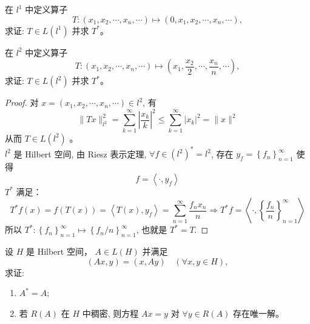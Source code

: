 \documentclass[lang=cn,newtx,10pt,scheme=chinese,thmcnt=chapter]{elegantbook}
\begin{document}
\begin{problem}
  在 ${l}^1$ 中定义算子
  \[
  T : (x_1, x_2, \cdots, x_n, \cdots) \mapsto (0, x_1, x_2, \cdots, x_n, \cdots),
  \]
  求证: $T \in {L}({l}^1)$ 并求 $T^*$。
\end{problem}

\begin{problem}
  在 ${l}^2$ 中定义算子
  \[
  T : (x_1, x_2, \cdots, x_n, \cdots) \mapsto (x_1, \frac{x_2}{2}, \cdots, \frac{x_n}{n}, \cdots),
  \]
  求证: $T \in {L}({l}^2)$ 并求 $T^*$。
\end{problem}
\begin{proof} 对 $x=\left(x_1, x_2, \cdots, x_n, \cdots\right) \in l^2$, 有
\begin{equation*}
\|T x\|_{l^2}^2=\sum_{k=1}^{\infty}\left|\frac{x_k}{k}\right|^2 \leqslant \sum_{k=1}^{\infty}\left|x_k\right|^2=\|x\|^2
\end{equation*}
从而 $T \in L \left(l^2\right)$ 。\\
$l^2$ 是 Hilbert 空间, 由 Riesz 表示定理, $\forall f \in\left(l^2\right)^*=l^2$, 存在 $y_f=\left\{f_n\right\}_{n=1}^{\infty}$ 使得
\begin{equation*}
f=\left\langle\cdot, y_f\right\rangle
\end{equation*}
$T^*$ 满足：
\begin{equation*}
T^* f(x)=f(T(x))=\left\langle T(x), y_f\right\rangle=\sum_{n=1}^{\infty} \frac{f_n x_n}{n} \Rightarrow T^* f=\left\langle\cdot,\left\{\frac{f_n}{n}\right\}_{n=1}^{\infty}\right\rangle
\end{equation*}
所以 $T^*:\left\{f_n\right\}_{n=1}^{\infty} \mapsto\left\{f_n / n\right\}_{n=1}^{\infty}$, 也就是 $T^*=T$.
\end{proof}
\begin{problem}
  设 ${H}$ 是 Hilbert 空间， $A \in L({H})$ 并满足
  \[
  (A x, y) = (x, A y) \quad (\forall x, y \in {H}),
  \]
  求证:
  \begin{enumerate}
    \item $A^* = A$;
    \item 若 $R(A)$ 在 ${H}$ 中稠密, 则方程 $A x = y$ 对 $\forall y \in R(A)$ 存在唯一解。
  \end{enumerate}
\end{problem}
\end{document}
